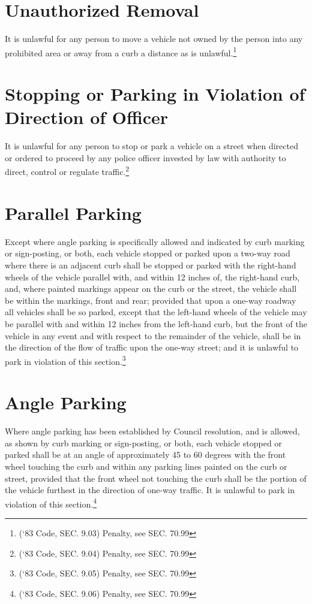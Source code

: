 \section{Unauthorized Removal}
It is unlawful for any person to move a vehicle not owned by the person into any prohibited area or away from a curb a distance as is unlawful.\footnote{(‘83 Code, SEC. 9.03)  Penalty, see SEC. 70.99}

\section{Stopping or Parking in Violation of Direction of Officer}
It is unlawful for any person to stop or park a vehicle on a street when directed or ordered to proceed by any police officer invested by law with authority to direct, control or regulate traffic.\footnote{(‘83 Code, SEC. 9.04)  Penalty, see SEC. 70.99}

\section{Parallel Parking}
Except where angle parking is specifically allowed and indicated by curb marking or sign-posting, or both, each vehicle stopped or parked upon a two-way road where there is an adjacent curb shall be stopped or parked with the right-hand wheels of the vehicle parallel with, and within 12 inches of, the right-hand curb, and, where painted markings appear on the curb or the street, the vehicle shall be within the markings, front and rear; provided that upon a one-way roadway all vehicles shall be so parked, except that the left-hand wheels of the vehicle may be parallel with and within 12 inches from the left-hand curb, but the front of the vehicle in any event and with respect to the remainder of the vehicle, shall be in the direction of the flow of traffic upon the one-way street; and it is unlawful to park in violation of this section.\footnote{(‘83 Code, SEC. 9.05)  Penalty, see SEC. 70.99}

\section{Angle Parking}
Where angle parking has been established by Council resolution, and is allowed, as shown by curb marking or sign-posting, or both, each vehicle stopped or parked shall be at an angle of approximately 45 to 60 degrees with the front wheel touching the curb and within any parking lines painted on the curb or street, provided that the front wheel not touching the curb shall be the portion of the vehicle furthest in the direction of one-way traffic.  It is unlawful to park in violation of this section.\footnote{(‘83 Code, SEC. 9.06)  Penalty, see SEC. 70.99}

